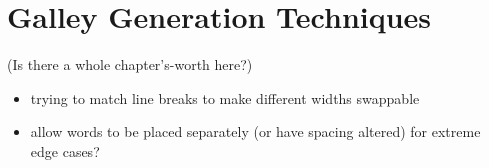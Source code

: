 \chapter{Galley Generation Techniques}\label{ch:galleys}


(Is there a whole chapter's-worth here?)

\begin{itemize}
 \item trying to match line breaks to make different widths swappable
 \item allow words to be placed separately (or have spacing altered) for extreme edge cases?
\end{itemize}


